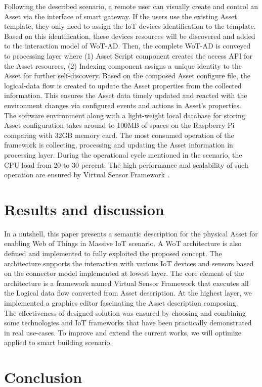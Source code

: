 Following the described scenario, a remote user can visually create and control an Asset via the interface of smart gateway. If the users use the existing Asset template, they only need to assign the IoT devices identification to the template. Based on this identification, these devices resources will be discovered and added to the interaction model of WoT-AD. Then, the complete WoT-AD is conveyed to processing layer where (1) Asset Script component creates the access API for the Asset resources, (2) Indexing component assigns a unique identity to the Asset for further self-discovery. Based on the composed Asset configure file, the logical-data flow is created to update the Asset properties from the collected information. This ensures the Asset data timely updated and reacted with the environment changes via configured events and actions in Asset's properties. \\

The software environment along with a light-weight local database for storing Asset configuration takes around to 100MB of spaces on the Raspberry Pi comparing with 32GB memory card. The most consumed operation of the framework is collecting, processing and updating the Asset information in processing layer. During the operational cycle mentioned in the scenario, the CPU load from 20 to 30 percent.
The high performance and scalability of such operation are ensured by Virtual Sensor Framework \cite{kim2017scalable}. 
\section{Results and discussion}
In a nutshell, this paper presents a semantic description for the physical Asset for enabling Web of Things in Massive IoT scenario. A WoT architecture is also defined and implemented to fully exploited the proposed concept. The architecture supports the interaction with various IoT devices and sensors based on the connector model implemented at lowest layer. The core element of the architecture is a framework named Virtual Sensor Framework that executes all the Logical data flow converted from Asset description. At the highest layer, we implemented a graphics editor fascinating the Asset description composing.\\
The effectiveness of designed solution was ensured by choosing and combining some technologies and IoT frameworks that have been practically demonstrated in real use-cases. To improve and extend the current works, we will optimize applied to smart building scenario. 
\section{Conclusion}
